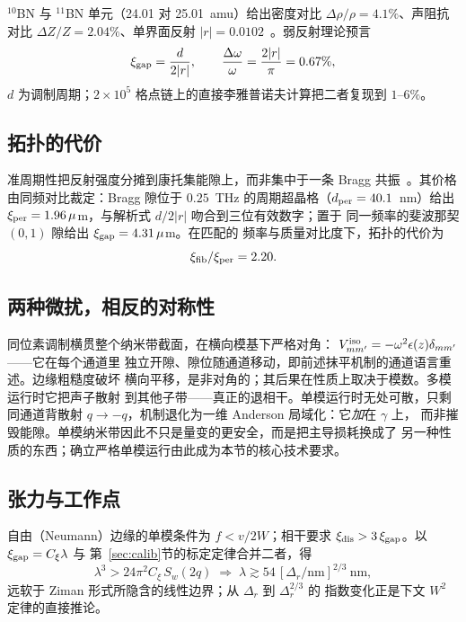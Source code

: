 \documentclass[11pt]{article}
\begin{document}
$^{10}$BN 与 $^{11}$BN 单元（24.01 对 25.01~amu）给出密度对比
$\Delta\rho/\rho = 4.1\%$、声阻抗对比 $\Delta Z/Z = 2.04\%$、单界面反射
$|r| = 0.0102$~\cite{vuong2018}。弱反射理论预言
\begin{equation}
\xi_{\rm gap} = \frac{d}{2|r|}, \qquad
\frac{\Delta\omega}{\omega} = \frac{2|r|}{\pi} = 0.67\%,
\end{equation}
$d$ 为调制周期；$2\times10^5$ 格点链上的直接李雅普诺夫计算把二者复现到
$1$--$6\%$。

\subsection{拓扑的代价}

准周期性把反射强度分摊到康托集能隙上，而非集中于一条 Bragg
共振~\cite{kohmoto1983,merlin1985}。其价格由同频对比裁定：Bragg 隙位于
$0.25$~THz 的周期超晶格（$d_{\rm per} = 40.1$~nm）给出
$\xi_{\rm per} = 1.96\,\mu$m，与解析式 $d/2|r|$ 吻合到三位有效数字；置于
同一频率的斐波那契 $(0,1)$ 隙给出 $\xi_{\rm gap} = 4.31\,\mu$m。在匹配的
频率与质量对比度下，拓扑的代价为
\begin{equation}
\xi_{\rm fib}/\xi_{\rm per} = 2.20 .
\end{equation}

\subsection{两种微扰，相反的对称性}

同位素调制横贯整个纳米带截面，在横向模基下严格对角：
$V^{\rm iso}_{mm'} = -\omega^2\epsilon(z)\delta_{mm'}$——它在每个通道里
独立开隙、隙位随通道移动，即前述抹平机制的通道语言重述。边缘粗糙度破坏
横向平移，是非对角的；其后果在性质上取决于模数。多模运行时它把声子散射
到其他子带——真正的退相干。单模运行时无处可散，只剩同通道背散射
$q \to -q$，机制退化为一维 Anderson 局域化：它\emph{加}在 $\gamma$ 上，
而非摧毁能隙。单模纳米带因此不只是量变的更安全，而是把主导损耗换成了
另一种性质的东西；确立严格单模运行由此成为本节的核心技术要求。

\subsection{张力与工作点}
\label{sec:tension}

自由（Neumann）边缘的单模条件为 $f < v/2W$；相干要求
$\xi_{\rm dis} > 3\,\xi_{\rm gap}$。以 $\xi_{\rm gap} = C_\xi\lambda$ 与
第~\ref{sec:calib}节的标定定律合并二者，得
\begin{equation}
\lambda^3 > 24\pi^2 C_\xi\, S_w(2q) \;\Rightarrow\;
\lambda \gtrsim 54\,[\Delta_r/\mathrm{nm}]^{2/3}~\mathrm{nm},
\end{equation}
远软于 Ziman 形式所隐含的线性边界；从 $\Delta_r$ 到 $\Delta_r^{2/3}$ 的
指数变化正是下文 $W^2$ 定律的直接推论。
\end{document}
